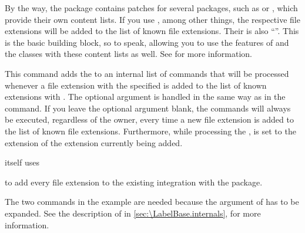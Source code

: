 By the way, the \href{https://www.ctan.org/pkg/scrhack}{}%
%
 package
contains patches for several packages, such as
 or
, which provide their own content
lists. If you use \href{https://www.ctan.org/pkg/scrhack}{},
among other things, the respective file extensions will be added to the list
of known file extensions. Their  is also ``''. This
is the basic building block, so to speak, allowing you to use the features of
 and the \KOMAScript{} classes with these content lists as
well. See \cite{pkg:scrhack:manual} for more information.%
\EndIndexGroup


\begin{Declaration}
\end{Declaration}
This command adds the  to an internal list of commands that
will be processed whenever a file extension with the specified 
is added to the list of known extensions with
. The optional argument is handled in the
same way as in the  command. If you leave
the optional argument blank, the commands will always be executed, regardless
of the owner, every time a new file extension is added to the list of known
file extensions. Furthermore, while processing the ,
 is set to the
extension of the extension currently being added.
\begin{Example}
   itself uses
\begin{lstcode}
  \AtAddToTocList[]{%
    \expandafter\tocbasic@extend@babel
    \expandafter{\@currext}%
  }
\end{lstcode}
  to add every file extension to the existing  integration
  with the  package.
\end{Example}

The two  commands in the example are needed because the
argument of  has to be expanded.
See the description of  in
\autoref{sec:\LabelBase.internals},
 for more information.%
\EndIndexGroup


